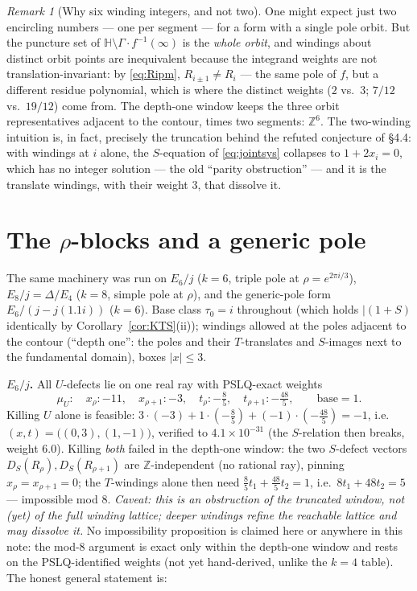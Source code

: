 \documentclass[11pt]{article}
\theoremstyle{definition}
\theoremstyle{remark}
\newtheorem{remark}{Remark}
\newcommand{\HH}{\mathbb{H}}
\newcommand{\ZZ}{\mathbb{Z}}
\begin{document}
\begin{remark}[Why six winding integers, and not two]\label{rem:whysix}
One might expect just two encircling numbers --- one per segment --- for a form with a
single pole orbit.  But the puncture set of $\HH\setminus\Gamma\!\cdot\!f^{-1}(\infty)$ is
the \emph{whole orbit}, and windings about distinct orbit points are inequivalent because
the integrand weights are not translation-invariant: by \eqref{eq:Ripm},
$R_{i\pm1}\neq R_i$ --- the same pole of $f$, but a different residue polynomial, which is
where the distinct weights ($2$ vs.\ $3$; $7/12$ vs.\ $19/12$) come from.  The depth-one
window keeps the three orbit representatives adjacent to the contour, times two segments:
$\ZZ^6$.  The two-winding intuition is, in fact, precisely the truncation behind the
refuted conjecture of \S4.4: with windings at $i$ alone, the $S$-equation of
\eqref{eq:jointsys} collapses to $1+2x_i=0$, which has no integer solution --- the old
``parity obstruction'' --- and it is the translate windings, with their weight $3$, that
dissolve it.
\end{remark}

\section{The $\rho$-blocks and a generic pole}\label{sec:rho}

The same machinery was run on $E_6/j$ ($k=6$, triple pole at $\rho=e^{2\pi i/3}$),
$E_8/j=\Delta/E_4$ ($k=8$, simple pole at $\rho$), and the generic-pole form
$E_6/(j-j(1.1i))$ ($k=6$).  Base class $\tau_0=i$ throughout (which holds $|(1+S)$
identically by Corollary~\ref{cor:KTS}(ii)); windings allowed at the poles adjacent to the
contour (``depth one'': the poles and their $T$-translates and $S$-images next to the
fundamental domain), boxes $|x|\le3$.

\smallskip
\noindent\textbf{$E_6/j$.}  All $U$-defects lie on one real ray with PSLQ-exact weights
\[
\mu_U:\quad x_\rho:-11,\quad x_{\rho+1}:-3,\quad t_\rho:-\tfrac85,\quad t_{\rho+1}:-\tfrac{48}5,
\qquad\text{base}=1 .
\]
Killing $U$ alone is feasible: $3\cdot(-3)+1\cdot(-\tfrac85)+(-1)\cdot(-\tfrac{48}5)=-1$,
i.e.\ $(x,t)=\big((0,3),(1,-1)\big)$, verified to $4.1\times10^{-31}$ (the $S$-relation
then breaks, weight $6.0$).  Killing \emph{both} failed in the depth-one window: the two
$S$-defect vectors $D_S(R_\rho),D_S(R_{\rho+1})$ are $\ZZ$-independent (no rational ray),
pinning $x_\rho=x_{\rho+1}=0$; the $T$-windings alone then need
$\tfrac85t_1+\tfrac{48}5t_2=1$, i.e.\ $8t_1+48t_2=5$ --- impossible mod $8$.
\emph{Caveat: this is an obstruction of the truncated window, not (yet) of the full
winding lattice; deeper windings refine the reachable lattice and may dissolve it.}
No impossibility proposition is claimed here or anywhere in this note: the mod-$8$
argument is exact only within the depth-one window and rests on the PSLQ-identified
weights (not yet hand-derived, unlike the $k=4$ table).  The honest general statement is:
\end{document}
